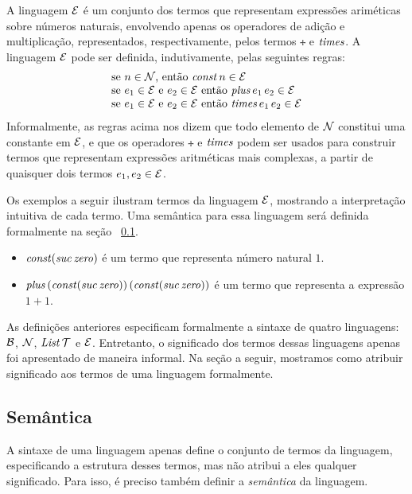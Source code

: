 \begin{Definition}\label{def:arithexp}
 A linguagem $\mathcal{E}$ é um conjunto dos termos que representam expressões ariméticas sobre números naturais, envolvendo apenas os operadores de adição e multiplicação, representados, respectivamente, pelos termos $\tplus$ e $\textit{times\/}$. A linguagem $\mathcal{E}$ pode ser definida, indutivamente, pelas seguintes regras:
  \[
  \begin{tabular}{l}
    se $n\in\Nat$, ent\~ao $\tconst\,n\in\TExp$ \\
    se $e_1 \in \TExp$  e  $e_2 \in \TExp$ ent\~ao $\tplus\,e_1\,e_2\in\TExp$\\
    se $e_1 \in \TExp$  e  $e_2 \in \TExp$ ent\~ao $\ttimes\,e_1\,e_2\in\TExp$
    \end{tabular}
  \]
Informalmente, as regras acima nos dizem que todo elemento de $\mathcal{N}$ constitui uma constante em $\mathcal{E}$, e que os operadores $\tplus$ e $\textit{times\/}$ podem ser usados para construir termos que representam expressões aritméticas mais complexas, a partir de quaisquer dois termos $e_1,e_2\in\mathcal{E}$.
\end{Definition}

\begin{Example}
 Os exemplos a seguir ilustram termos da linguagem $\mathcal{E}$, mostrando a interpretação intuitiva de cada termo. Uma semântica para essa linguagem será definida formalmente na seção ~\ref{cap1:sem}. 
  \begin{itemize}
    \item $\textit{const\/} (\textit{suc\/}\, \textit{zero\/})$ é um termo que representa n\'umero natural $1$.
    \item $\textit{plus\/}\, (\textit{const\/} (\textit{suc\/}\, \textit{zero\/}))\, (\textit{const\/} (\textit{suc\/} \,\textit{zero\/}))$ é um termo que representa a express\~ao $1 + 1$.
  \end{itemize}
 \end{Example}

As defini\c{c}\~oes anteriores especificam formalmente a sintaxe de quatro linguagens: $\mathcal{B}$, $\mathcal{N}$, $\textit{List\/}\,\mathcal{T}$ e $\mathcal{E}$.  Entretanto, o significado dos termos dessas linguagens apenas foi apresentado de maneira informal.  Na se\c{c}\~ao a seguir, mostramos como atribuir significado aos termos de uma linguagem formalmente.

\subsection{Sem\^antica}\label{cap1:sem}
A sintaxe de uma linguagem apenas define o conjunto de termos da linguagem, especificando a  estrutura desses termos, mas não atribui a eles qualquer significado. Para isso, é preciso também 
definir a \emph{semântica} da linguagem.

